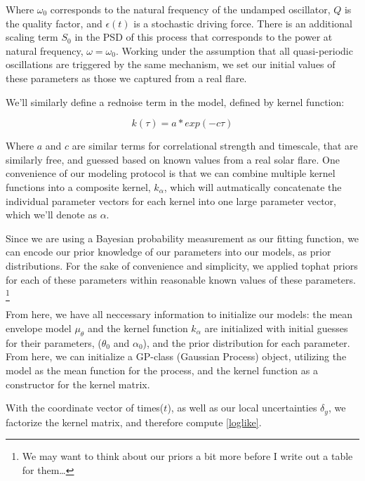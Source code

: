 \documentclass{aastex61}
\begin{document}
Where $\omega_0$ corresponds to the natural frequency of the undamped oscillator, $Q$ is the quality factor, and $\epsilon(t)$ is a stochastic driving force.
There is an additional scaling term $S_0$ in the PSD of this process that corresponds to the power at natural frequency, $\omega=\omega_0$.
Working under the assumption that all quasi-periodic oscillations are triggered by the same mechanism, we set our initial values of these parameters as those we captured from a real flare.

We'll similarly define a rednoise term in the model, defined by kernel function:

\begin{equation}
	k(\tau) = a * exp(-c\tau)
	\label{rednoise}
\end{equation}

Where $a$ and $c$ are similar terms for correlational strength and timescale, that are similarly free, and guessed based on known values from a real solar flare.
One convenience of our modeling protocol is that we can combine multiple kernel functions into a composite kernel, $k_\alpha$, which will autmatically concatenate the individual parameter vectors for each kernel into one large parameter vector, which we'll denote as $\alpha$.

Since we are using a Bayesian probability measurement as our fitting function, we can encode our prior knowledge of our parameters into our models, as prior distributions. 
For the sake of convenience and simplicity, we applied tophat priors for each of these parameters within reasonable known values of these parameters. 
\footnote{We may want to think about our priors a bit more before I write out a table for them\ldots}	


From here, we have all neccessary information to initialize our models: the mean envelope model $\mu_\theta$  and the kernel function $k_\alpha$ are initialized with initial guesses for their parameters, ($\theta_0$ and $\alpha_0$), and the prior distribution for each parameter.
From here, we can initialize a GP-class (Gaussian Process) object, utilizing the model as the mean function for the process, and the kernel function as a constructor for the kernel matrix.

With the coordinate vector of times($t$), as well as our local uncertainties $\delta_y$, we factorize the kernel matrix, and therefore compute \ref{loglike}.
\end{document}
